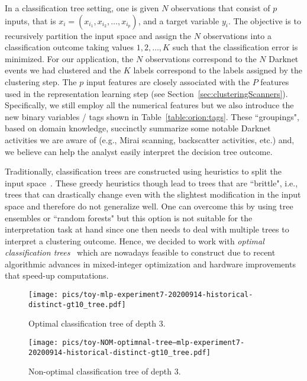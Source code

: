 \documentclass[manuscript, nonacm]{acmart}
\begin{document}
In a classification tree setting, one is given $N$ observations that
consist of $p$ inputs, that is $x_i = (x_{i_1}, x_{i_2}, \ldots, x_{i_p})$,
and a target variable $y_i$. The objective is to recursively 
partition the input space and assign the $N$ observations
into a classification outcome taking values $1, 2, \ldots, K$ such that
the classification error is minimized. For our application, the $N$
observations correspond to the $N$ Darknet events we had clustered and the 
$K$ labels correspond to the labels assigned by the clustering step. 
The $p$ input features are closely associated with the $P$ features used in the
representation learning step (see Section~\ref{sec:clusteringScanners}). Specifically, we still employ all the numerical features
but we also introduce the new binary variables / tags shown in Table~\ref{table:orion:tags}. These
``groupings", based on domain knowledge, succinctly summarize some notable Darknet activities we are aware of (e.g., Mirai
scanning, backscatter activities, etc.) and, we believe can help the analyst easily interpret the
decision tree outcome.

Traditionally, classification trees are constructed using heuristics to split the input
space~\cite{Breiman1983ClassificationAR, bertsimas17optimal, hastie01statisticallearning}. 
These greedy heuristics though lead to trees that are ``brittle", i.e., trees that can
drastically change even with the slightest modification in the input space
and therefore do not generalize well. One can overcome this by using tree
ensembles or ``random forests" but this option is not suitable for the interpretation task at hand since
one then needs to deal with multiple trees to interpret a clustering outcome. Hence,
we decided to work with \emph{optimal classification trees}~\cite{bertsimas17optimal}
which are nowadays feasible to construct due to recent algorithmic 
advances in mixed-integer optimization and hardware improvements that speed-up computations. 

\begin{figure}[ht]
    \centering
    \texttt{[image: pics/toy-mlp-experiment7-20200914-historical-distinct-gt10\_tree.pdf]}
    \caption{Optimal classification tree of depth 3.}
    \label{fig:toytree}
\end{figure}

\begin{figure}[ht]
    \centering
    \texttt{[image: pics/toy-NOM-optimnal-tree--mlp-experiment7-20200914-historical-distinct-gt10\_tree.pdf]}
    \caption{Non-optimal classification tree of depth 3.}
    \label{fig:toytree-nonoptimal}
\end{figure}
\end{document}
